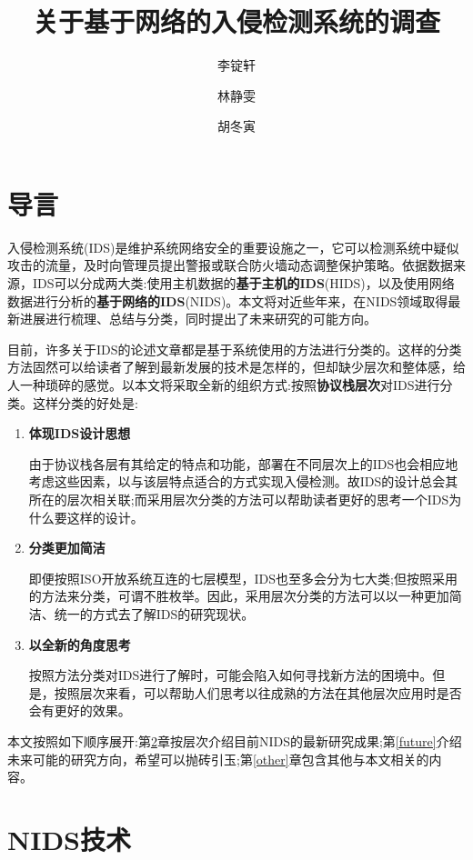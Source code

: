 \documentclass[12pt]{article} %
\title{关于基于网络的入侵检测系统的调查}
\author{李锭轩 \and 林静雯 \and 胡冬寅}
\date{} %
\begin{document}
\maketitle

\section{导言}
\label{intro}

入侵检测系统(IDS)是维护系统网络安全的重要设施之一，它可以检测系统中疑似攻击的流量，及时向管理员提出警报或联合防火墙动态调整保护策略。依据数据来源，IDS可以分成两大类:使用主机数据的\textbf{基于主机的IDS}(HIDS)，以及使用网络数据进行分析的\textbf{基于网络的IDS}(NIDS)。本文将对近些年来，在NIDS领域取得最新进展进行梳理、总结与分类，同时提出了未来研究的可能方向。

目前，许多关于IDS的论述文章都是基于系统使用的方法进行分类的。这样的分类方法固然可以给读者了解到最新发展的技术是怎样的，但却缺少层次和整体感，给人一种琐碎的感觉。以本文将采取全新的组织方式:按照\textbf{协议栈层次}对IDS进行分类。这样分类的好处是:

\begin{enumerate}
	\item \textbf{体现IDS设计思想}

	由于协议栈各层有其给定的特点和功能，部署在不同层次上的IDS也会相应地考虑这些因素，以与该层特点适合的方式实现入侵检测。故IDS的设计总会其所在的层次相关联;而采用层次分类的方法可以帮助读者更好的思考一个IDS为什么要这样的设计。

	\item \textbf{分类更加简洁}

	即便按照ISO开放系统互连的七层模型，IDS也至多会分为七大类;但按照采用的方法来分类，可谓不胜枚举。因此，采用层次分类的方法可以以一种更加简洁、统一的方式去了解IDS的研究现状。

	\item \textbf{以全新的角度思考}

	按照方法分类对IDS进行了解时，可能会陷入如何寻找新方法的困境中。但是，按照层次来看，可以帮助人们思考以往成熟的方法在其他层次应用时是否会有更好的效果。
\end{enumerate}

本文按照如下顺序展开:第\ref{main}章按层次介绍目前NIDS的最新研究成果;第\ref{future}介绍未来可能的研究方向，希望可以抛砖引玉;第\ref{other}章包含其他与本文相关的内容。
\section{NIDS技术}
\label{main}
\end{document}
